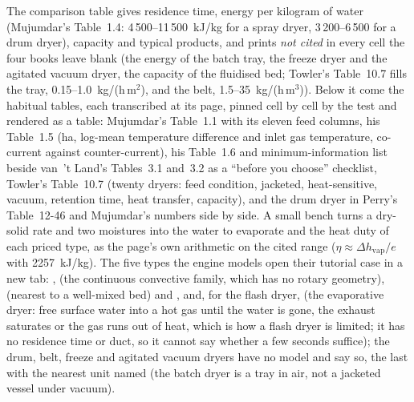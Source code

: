 \documentclass[11pt,a4paper]{article}
\begin{document}
The comparison table gives residence time, energy per kilogram of water
(Mujumdar's Table~1.4: 4\,500--11\,500~kJ/kg for a spray dryer, 3\,200--6\,500
for a drum dryer), capacity and typical products, and prints \emph{not cited}
in every cell the four books leave blank (the energy of the batch tray, the
freeze dryer and the agitated vacuum dryer, the capacity of the fluidised bed; Towler's Table~10.7 fills the
tray, 0.15--1.0~kg/(h\,m$^2$), and the belt, 1.5--35~kg/(h\,m$^3$)).  Below it come the
habitual tables, each transcribed at its page, pinned cell by cell by the test
and rendered as a table: Mujumdar's Table~1.1 with its eleven feed columns, his
Table~1.5 (ha, log-mean temperature difference and inlet gas temperature,
co-current against counter-current), his Table~1.6 and minimum-information list
beside van~'t Land's Tables~3.1 and~3.2 as a ``before you choose'' checklist,
Towler's Table~10.7 (twenty dryers: feed condition, jacketed, heat-sensitive,
vacuum, retention time, heat transfer, capacity), and the drum dryer in
Perry's Table~12-46 and Mujumdar's numbers side by side.  A small
bench turns a dry-solid rate and two moistures into the water to evaporate and
the heat duty of each priced type, as the page's own arithmetic on the cited
range ($\eta \approx \Delta h_\mathrm{vap}/e$ with 2257~kJ/kg).  The five
types the engine models open their tutorial case in a new tab:
,
 (the continuous convective
family, which has no rotary geometry),
 (nearest to a well-mixed bed) and
, and, for the flash dryer,
 (the evaporative dryer: free surface water into
a hot gas until the water is gone, the exhaust saturates or the gas runs out of heat,
which is how a flash dryer is limited; it has no residence time or duct, so it cannot
say whether a few seconds suffice); the drum, belt, freeze and agitated vacuum dryers
have no model and say so, the last with the nearest unit named (the batch dryer is a
tray in air, not a jacketed vessel under vacuum).
\end{document}
